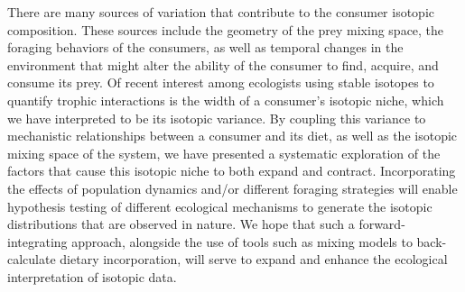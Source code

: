 \documentclass{frontiersSCNS}
\begin{document}
%



There are many sources of variation that contribute to the consumer isotopic composition.
These sources include the geometry of the prey mixing space, the foraging behaviors of the consumers, as well as temporal changes in the environment that might alter the ability of the consumer to find, acquire, and consume its prey.
Of recent interest among ecologists using stable isotopes to quantify trophic interactions is the width of a consumer's isotopic niche, which we have interpreted to be its isotopic variance.
By coupling this variance to mechanistic relationships between a consumer and its diet, as well as the isotopic mixing space of the system, we have presented a systematic exploration of the factors that cause this isotopic niche to both expand and contract.
Incorporating the effects of population dynamics and/or different foraging strategies will enable hypothesis testing of different ecological mechanisms to generate the isotopic distributions that are observed in nature.
We hope that such a forward-integrating approach, alongside the use of tools such as mixing models to back-calculate dietary incorporation, will serve to expand and enhance the ecological interpretation of isotopic data.
\end{document}
